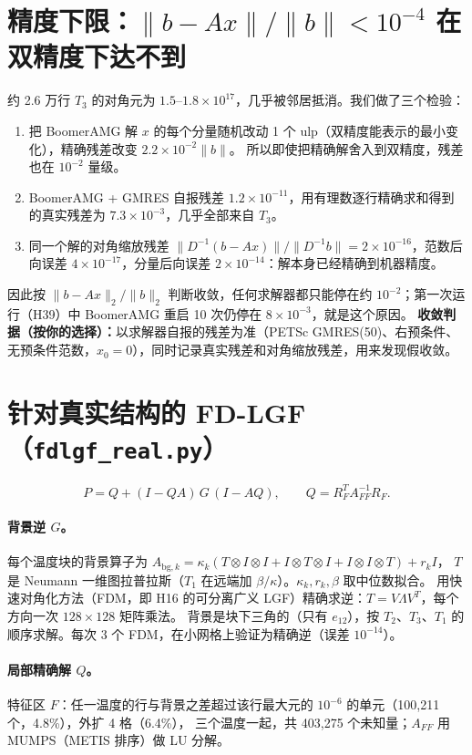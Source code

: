 \documentclass[11pt,a4paper]{ctexart}
\begin{document}
\section{精度下限：$\|b-Ax\|/\|b\|<10^{-4}$ 在双精度下达不到}
约 2.6 万行 $T_3$ 的对角元为 $1.5$--$1.8\times10^{17}$，几乎被邻居抵消。我们做了三个检验：
\begin{enumerate}
\item 把 BoomerAMG 解 $x$ 的每个分量随机改动 1 个 ulp（双精度能表示的最小变化），精确残差改变 $2.2\times10^{-2}\|b\|$。
所以即使把精确解舍入到双精度，残差也在 $10^{-2}$ 量级。
\item BoomerAMG + GMRES 自报残差 $1.2\times10^{-11}$，用有理数逐行精确求和得到的真实残差为 $7.3\times10^{-3}$，几乎全部来自 $T_3$。
\item 同一个解的对角缩放残差 $\|D^{-1}(b-Ax)\|/\|D^{-1}b\|=2\times10^{-16}$，范数后向误差 $4\times10^{-17}$，分量后向误差 $2\times10^{-14}$：解本身已经精确到机器精度。
\end{enumerate}
因此按 $\|b-Ax\|_2/\|b\|_2$ 判断收敛，任何求解器都只能停在约 $10^{-2}$；第一次运行（H39）中 BoomerAMG 重启 10 次仍停在 $8\times10^{-3}$，就是这个原因。
\textbf{收敛判据（按你的选择）：}以求解器自报的残差为准（PETSc GMRES(50)、右预条件、无预条件范数，$x_0=0$），同时记录真实残差和对角缩放残差，用来发现假收敛。

\section{针对真实结构的 FD-LGF（\texttt{fdlgf\_real.py}）}
\[
P=Q+(I-QA)\,G\,(I-AQ),\qquad Q=R_F^{T}A_{FF}^{-1}R_F .
\]
\paragraph{背景逆 $G$。}每个温度块的背景算子为 $A_{\mathrm{bg},k}=\kappa_k(T\otimes I\otimes I+I\otimes T\otimes I+I\otimes I\otimes T)+r_k I$，
$T$ 是 Neumann 一维图拉普拉斯（$T_1$ 在远端加 $\beta/\kappa$）。$\kappa_k,r_k,\beta$ 取中位数拟合。
用快速对角化方法（FDM，即 H16 的可分离广义 LGF）精确求逆：$T=V\Lambda V^T$，每个方向一次 $128\times128$ 矩阵乘法。
背景是块下三角的（只有 $e_{12}$），按 $T_2$、$T_3$、$T_1$ 的顺序求解。每次 3 个 FDM，在小网格上验证为精确逆（误差 $10^{-14}$）。
\paragraph{局部精确解 $Q$。}特征区 $F$：任一温度的行与背景之差超过该行最大元的 $10^{-6}$ 的单元（100,211 个，4.8\%），外扩 4 格（6.4\%），
三个温度一起，共 403,275 个未知量；$A_{FF}$ 用 MUMPS（METIS 排序）做 LU 分解。
\end{document}
